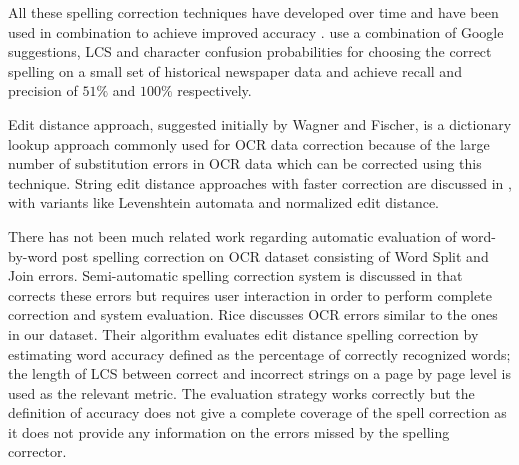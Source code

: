 \documentclass[12pt]{article}
\begin{document}
All these spelling correction techniques have developed over time and have been used in combination to achieve improved accuracy \cite{brill2000improved}. \cite{agarwal2013utilizing} use a combination of Google suggestions, LCS and character confusion probabilities for choosing the correct spelling on a small set of historical newspaper data and achieve recall and precision of $51\%$ and $100\%$ respectively.


Edit distance approach, suggested initially by Wagner and Fischer\cite{wagner1974string}, is a dictionary lookup approach commonly used for OCR data correction because of the large number of substitution errors in OCR data  \cite{kukich1992techniques}\cite{christen2006comparison} which can be corrected using this technique. String edit distance approaches with faster correction are discussed in \cite{marzal1993computation},\cite{schulz2002fast}  with variants like Levenshtein automata and normalized edit distance.


There has not been much related work regarding automatic evaluation of word-by-word post spelling correction on OCR dataset consisting of Word Split and Join errors. Semi-automatic spelling correction system is discussed in \cite{taghva2001ocrspell} that corrects these errors but requires user interaction in order to perform complete correction and system evaluation. Rice\cite{rice1996measuring} discusses OCR errors similar to the ones in our dataset. Their algorithm evaluates edit distance spelling correction by estimating word accuracy defined as the percentage of correctly recognized words; the length of LCS between correct and incorrect strings on a page by page level is used as the relevant metric. The evaluation strategy works correctly but the definition of accuracy does not give a complete coverage of the spell correction as it does not provide any information on the errors missed by the spelling corrector.
\end{document}
